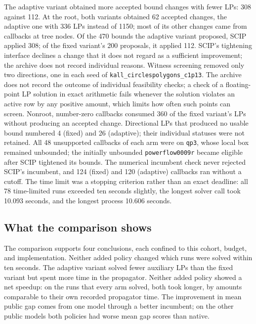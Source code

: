 The adaptive variant obtained more accepted bound changes with fewer LPs: 308
against 112. At the root, both variants obtained 62 accepted changes, the
adaptive one with 336 LPs instead of 1150; most of its other changes came from
callbacks at tree nodes. Of the 470 bounds the adaptive variant proposed, SCIP applied 308;
of the fixed variant's 200 proposals, it applied 112. SCIP's tightening
interface declines a change that it does not regard as a sufficient
improvement; the archive does not record individual reasons. Witness screening
removed only two directions, one in each seed of
\texttt{kall\_circlespolygons\_c1p13}. The archive does not record the outcome of
individual feasibility checks; a check of a floating-point LP solution in exact
arithmetic fails whenever the solution violates an active row by any positive
amount, which limits how often such points can screen. Nonroot, number-zero callbacks consumed
360 of the fixed variant's LPs without producing an accepted change. Directional
LPs that produced no usable bound numbered 4 (fixed) and 26 (adaptive); their
individual statuses were not retained. All 48 unsupported callbacks of each arm
were on \texttt{qp3}, whose local box remained unbounded; the initially unbounded
\texttt{powerflow0009r} became eligible after SCIP tightened its bounds. The
numerical incumbent check never rejected SCIP's incumbent, and 124 (fixed) and
120 (adaptive) callbacks ran without a cutoff. The time limit was a stopping
criterion rather than an exact deadline: all 78 time-limited runs exceeded ten
seconds slightly, the longest solver call took 10.093 seconds, and the longest
process 10.606 seconds.

\subsection{What the comparison shows}\label{sec:experiments-interpretation}

The comparison supports four conclusions, each confined to this cohort,
budget, and implementation. Neither added policy changed which runs were solved
within ten seconds. The adaptive variant solved fewer auxiliary LPs than the
fixed variant but spent more time in the propagator. Neither added policy showed
a net speedup: on the runs that every arm solved, both took longer, by amounts
comparable to their own recorded propagator time. The improvement in mean public
gap comes from one model through a better incumbent; on the other public models
both policies had worse mean gap scores than native.

